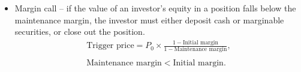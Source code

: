 \documentclass[../notes_compiled.tex]{subfiles}
\begin{document}
\begin{itemize}
{Now thinking about the return on margin position,
\begin{align*}
\text{Investor equity} &= 0.4 \times 1,000 \times \$100 = \$40,000, \\
\text{Commission on purchase} &= 1,000\times\$0.05 = \$50, \\
\text{Cash investment} &= \$40,050, \\ \\
\text{Dividend} &= 1,000 \times \$2 = \$2,000, \\
\text{Interest on loan} &= 0.04 \times \$60,000  = \$2,400, \\
\text{Sale proceeds} &= 1,000 \times \$110 = \$110,000, \\
\text{Commission on sale} &= 1,000 \times \$0.05 = \$50, \\ \\
\text{Net proceeds} &= \$110,000 + \underbrace{\$2,000}_{\text{Dividend}} - \underbrace{\$60,000}_{\text{Principal}} - \underbrace{\$2,400}_{\text{Interest}} - \$50, \\
&=\$49,550, \\ \\
\text{Return on margin position} &= \frac{\$49,550}{\$40,000}-1 = 23.72\%.
\end{align*}
}

\item Margin call -- if the value of an investor’s equity in a position falls below the maintenance margin, the investor must either deposit cash or marginable securities, or close out the position.
\begin{gather}
\text{Trigger price} = P_{0} \times \frac{1-\text{Initial margin}}{1-\text{Maintenance margin}}, \\ \nonumber \\
\text{Maintenance margin} < \text{Initial margin}. \nonumber
\end{gather}

\end{itemize}
\end{document}
